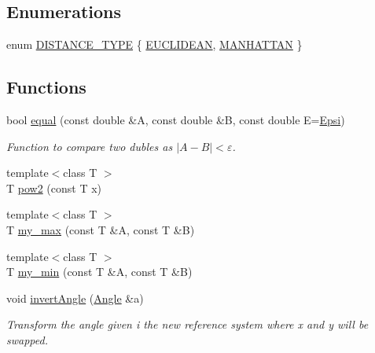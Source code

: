 \subsection*{Enumerations}
\begin{DoxyCompactItemize}
\item 
enum \mbox{\hyperlink{maths_8hh_ac50d7263b1cae8691420b86282b27f90}{D\+I\+S\+T\+A\+N\+C\+E\+\_\+\+T\+Y\+PE}} \{ \mbox{\hyperlink{maths_8hh_ac50d7263b1cae8691420b86282b27f90a81bbbc4428c3ff3f1327e94957e2b5f1}{E\+U\+C\+L\+I\+D\+E\+AN}}, 
\mbox{\hyperlink{maths_8hh_ac50d7263b1cae8691420b86282b27f90a9ae95b5995796e7e5f32fa482a5bff98}{M\+A\+N\+H\+A\+T\+T\+AN}}
 \}
\end{DoxyCompactItemize}
\subsection*{Functions}
\begin{DoxyCompactItemize}
\item 
bool \mbox{\hyperlink{maths_8hh_a24e66125d5c9aea6608f537bdf77841e}{equal}} (const double \&A, const double \&B, const double E=\mbox{\hyperlink{maths_8hh_a78802b279ab85021d7f6bffe51621703}{Epsi}})
\begin{DoxyCompactList}\small\item\em Function to compare two dubles as $\vert A-B\vert < \varepsilon$. \end{DoxyCompactList}\item 
{\footnotesize template$<$class T $>$ }\\T \mbox{\hyperlink{maths_8hh_a054f7427a96b10baa550060a0376584c}{pow2}} (const T x)
\item 
{\footnotesize template$<$class T $>$ }\\T \mbox{\hyperlink{maths_8hh_ab5d415a0bb0219a327f458c94fe972d3}{my\+\_\+max}} (const T \&A, const T \&B)
\item 
{\footnotesize template$<$class T $>$ }\\T \mbox{\hyperlink{maths_8hh_ad7d1cdfd24f29909819edf72add024a3}{my\+\_\+min}} (const T \&A, const T \&B)
\item 
void \mbox{\hyperlink{maths_8hh_a3af8b8654f1cdb8e8e4b8f72dcc5edd5}{invert\+Angle}} (\mbox{\hyperlink{class_angle}{Angle}} \&a)
\begin{DoxyCompactList}\small\item\em Transform the angle given i the new reference system where x and y will be swapped. \end{DoxyCompactList}\end{DoxyCompactItemize}
